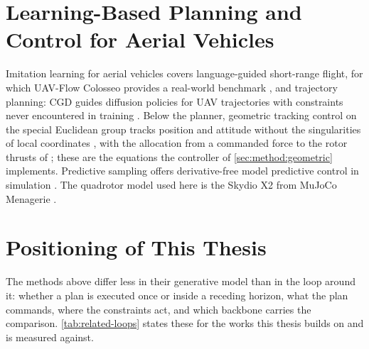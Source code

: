 \section{Learning-Based Planning and Control for Aerial Vehicles}\label{sec:rel:aerial}

Imitation learning for aerial vehicles covers language-guided short-range flight, for which UAV-Flow
Colosseo provides a real-world benchmark \parencite{wang2025uavflow}, and trajectory planning: CGD
guides diffusion policies for \ac{UAV} trajectories with constraints never encountered in training
\parencite{kondo2024cgd}. Below the planner, geometric tracking control on the special Euclidean group tracks position and attitude
without the singularities of local coordinates \parencite[Eqs.~(19)--(23), Prop.~3]{lee2010geometric},
with the allocation from a commanded force to the rotor thrusts of \parencite{mellinger2011minimum}; these
are the equations the controller of \autoref{sec:method:geometric} implements. Predictive sampling offers derivative-free model
predictive control in simulation \parencite{howell2022predictive}. The quadrotor model used here is the Skydio X2 from MuJoCo
Menagerie \parencite{zakka2022menagerie}.

\section{Positioning of This Thesis}\label{sec:rel:positioning}

The methods above differ less in their generative model than in the loop around it: whether a plan is
executed once or inside a receding horizon, what the plan commands, where the constraints act, and
which backbone carries the comparison. \autoref{tab:related-loops} states these for the works this
thesis builds on and is measured against.

